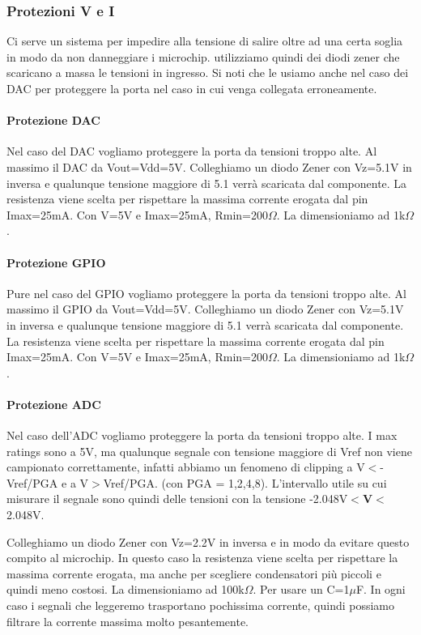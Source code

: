 \documentclass[10pt]{article}
\begin{document}
		\subsubsection{Protezioni V e I}
		Ci serve un sistema per impedire alla tensione di salire oltre ad una certa soglia in modo da non danneggiare i microchip. utilizziamo quindi dei diodi zener che scaricano a massa le tensioni in ingresso.
		Si noti che le usiamo anche nel caso dei DAC per proteggere la porta nel caso in cui venga collegata erroneamente.
			\paragraph{Protezione DAC}
				Nel caso del DAC vogliamo proteggere la porta da tensioni troppo alte. Al massimo il DAC da Vout=Vdd=5V. Colleghiamo un diodo Zener con Vz=5.1V in inversa e qualunque tensione maggiore di 5.1 verrà scaricata dal componente.
				La resistenza viene scelta per rispettare la massima corrente erogata dal pin Imax=25mA. Con V=5V e Imax=25mA, Rmin=200\(\Omega\). La dimensioniamo ad 1k\(\Omega\).
			\paragraph{Protezione GPIO}
				Pure nel caso del GPIO vogliamo proteggere la porta da tensioni troppo alte. Al massimo il GPIO da Vout=Vdd=5V. Colleghiamo un diodo Zener con Vz=5.1V in inversa e qualunque tensione maggiore di 5.1 verrà scaricata dal componente.
				La resistenza viene scelta per rispettare la massima corrente erogata dal pin Imax=25mA. Con V=5V e Imax=25mA, Rmin=200\(\Omega\). La dimensioniamo ad 1k\(\Omega\).
			\paragraph{Protezione ADC}
				Nel caso dell'ADC vogliamo proteggere la porta da tensioni troppo alte. I max ratings sono a 5V, ma qualunque segnale con tensione maggiore di Vref non viene campionato correttamente,
				infatti abbiamo un fenomeno di clipping a V\(<\)-Vref/PGA e a V\(>\)Vref/PGA. (con PGA = 1,2,4,8).
				L'intervallo utile su cui misurare il segnale sono quindi delle tensioni con la tensione -2.048V\(<\)\textbf{V}\(<\)2.048V.

				Colleghiamo un diodo Zener con Vz=2.2V in inversa e in modo da evitare questo compito al microchip.
				In questo caso la resistenza viene scelta per rispettare la massima corrente erogata, ma anche per scegliere condensatori più piccoli e quindi meno costosi.
				La dimensioniamo ad 100k\(\Omega\). Per usare un C=1\(\mu\)F. In ogni caso i segnali che leggeremo trasportano pochissima corrente, quindi possiamo filtrare la corrente massima molto pesantemente.
\end{document}
